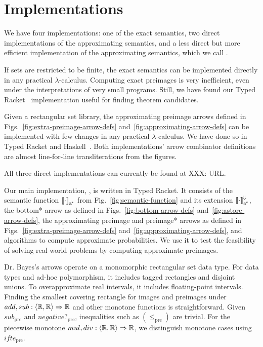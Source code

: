 \documentclass{llncs}
\newcommand{\figref}[1]{Fig.~\ref{#1}}
\newcommand{\figsref}[1]{Figs.~\ref{#1}}
\newcommand{\conv}{^{\mspace{-2mu}\Downarrow\mspace{-2mu}}}
\newcommand{\arrowif}{\ensuremath{ifte}}
\newcommand{\genc}{_\mathrm{a^{\mspace{-2mu}*}}}
\newcommand{\pre}{_\mathrm{pre}}
\newcommand{\ifpre}{\arrowif\pre}
\begin{document}

\section{Implementations}
\label{sec:implementation}

We have four implementations: one of the exact semantics, two direct implementations of the approximating semantics, and a less direct but more efficient implementation of the approximating semantics, which we call .

If sets are restricted to be finite, the exact semantics can be implemented directly in any practical $\lambda$-calculus.
Computing exact preimages is very inefficient, even under the interpretations of very small programs.
Still, we have found our Typed Racket~\cite{cit:tobin-hochstadt-2008popl-typed-scheme} implementation useful for finding theorem candidates.

Given a rectangular set library, the approximating preimage arrows defined in \figsref{fig:extra-preimage-arrow-defs} and~\ref{fig:approximating-arrow-defs} can be implemented with few changes in any practical $\lambda$-calculus.
We have done so in Typed Racket and Haskell~\cite{cit:haskell-lang}.
Both implementations' arrow combinator definitions are almost line-for-line transliterations from the figures.

All three direct implementations can currently be found at XXX: URL.

Our main implementation, , is written in Typed Racket.
It consists of the semantic function $\meaningof{\cdot}\genc$ from \figref{fig:semantic-function} and its extension $\meaningof{\cdot}\genc\conv$, the bottom* arrow as defined in \figsref{fig:bottom-arrow-defs} and~\ref{fig:astore-arrow-defs}, the approximating preimage and preimage* arrows as defined in \figsref{fig:extra-preimage-arrow-defs} and~\ref{fig:approximating-arrow-defs}, and algorithms to compute approximate probabilities.
We use it to test the feasibility of solving real-world problems by computing approximate preimages.

Dr. Bayes's arrows operate on a monomorphic rectangular set data type.
For data types and ad-hoc polymorphism, it includes tagged rectangles and disjoint unions.
To overapproximate real intervals, it includes floating-point intervals.
Finding the smallest covering rectangle for images and preimages under $add, sub : \langle{\mathbb{R},\mathbb{R}}\rangle \Rightarrow \mathbb{R}$ and other monotone functions is straightforward.
Given $sub\pre$ and $negative?\pre$, inequalities such as $(\leq\pre)$ are trivial.
For the piecewise monotone $mul, div : \langle{\mathbb{R},\mathbb{R}}\rangle \Rightarrow \mathbb{R}$, we distinguish monotone cases using $\ifpre$.
\end{document}
